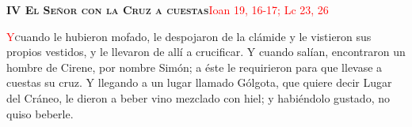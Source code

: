 \noindent\textbf{\textsc{IV El Señor con la Cruz a cuestas}}\hfill\textcolor{red}{Ioan 19, 16-17; Lc 23, 26}

\vspace{0.25em}

\lettrine[lines=2]{\textcolor{red}{Y}} cuando le hubieron mofado, le despojaron de la clámide y le vistieron sus propios vestidos, y le llevaron de allí a crucificar.
Y cuando salían, encontraron un hombre de Cirene, por nombre Simón; a éste le requirieron para que llevase a cuestas su cruz. Y llegando a un lugar llamado Gólgota,
que quiere decir Lugar del Cráneo, le dieron a beber vino mezclado con hiel; y habiéndolo gustado, no quiso beberle.